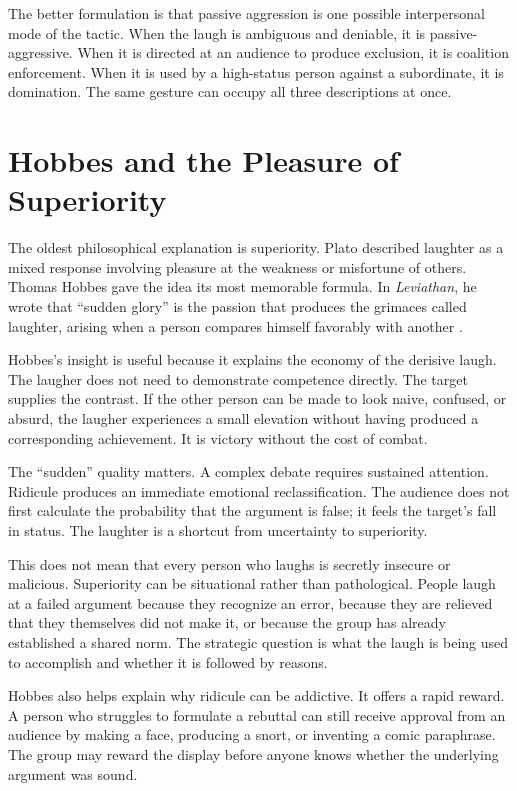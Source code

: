 ﻿\documentclass[12pt,a4paper]{book}
\begin{document}
The better formulation is that passive aggression is one possible interpersonal mode of the tactic. When the laugh is ambiguous and deniable, it is passive-aggressive. When it is directed at an audience to produce exclusion, it is coalition enforcement. When it is used by a high-status person against a subordinate, it is domination. The same gesture can occupy all three descriptions at once.

\section{Hobbes and the Pleasure of Superiority}

The oldest philosophical explanation is superiority. Plato described laughter as a mixed response involving pleasure at the weakness or misfortune of others. Thomas Hobbes gave the idea its most memorable formula. In \emph{Leviathan}, he wrote that ``sudden glory'' is the passion that produces the grimaces called laughter, arising when a person compares himself favorably with another \cite{hobbes1651}.

Hobbes's insight is useful because it explains the economy of the derisive laugh. The laugher does not need to demonstrate competence directly. The target supplies the contrast. If the other person can be made to look naive, confused, or absurd, the laugher experiences a small elevation without having produced a corresponding achievement. It is victory without the cost of combat.

The ``sudden'' quality matters. A complex debate requires sustained attention. Ridicule produces an immediate emotional reclassification. The audience does not first calculate the probability that the argument is false; it feels the target's fall in status. The laughter is a shortcut from uncertainty to superiority.

This does not mean that every person who laughs is secretly insecure or malicious. Superiority can be situational rather than pathological. People laugh at a failed argument because they recognize an error, because they are relieved that they themselves did not make it, or because the group has already established a shared norm. The strategic question is what the laugh is being used to accomplish and whether it is followed by reasons.

Hobbes also helps explain why ridicule can be addictive. It offers a rapid reward. A person who struggles to formulate a rebuttal can still receive approval from an audience by making a face, producing a snort, or inventing a comic paraphrase. The group may reward the display before anyone knows whether the underlying argument was sound.
\end{document}
